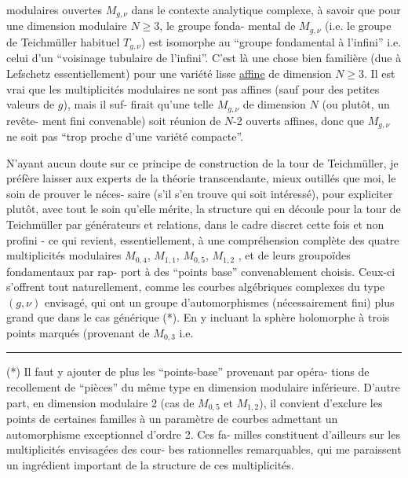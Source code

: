 
modulaires ouvertes $M_{g,\nu}$ dans le contexte analytique complexe,
à savoir que pour une dimension modulaire $N \geq 3$, le groupe fonda-%
mental de $M_{g,\nu}$ (i.e. le groupe de Teichmüller habituel $T_{g,\nu}$)
est isomorphe au ``groupe fondamental à l'infini'' i.e. celui d'un
``voisinage tubulaire de l'infini''. C'est là une chose bien familière
(due à Lefschetz essentiellement) pour une variété lisse \uline{affine} de
dimension $N \geq 3$. Il est vrai que les multiplicités modulaires ne
sont pas affines (sauf pour des petites valeurs de $g$), mais il suf-%
firait qu'une telle $M_{g,\nu}$ de dimension $N$ (ou plutôt, un revête-%
\margin{\unsure{$\frown$}}ment fini convenable) soit réunion de $N$-2 ouverts affines, donc
que $M_{g,\nu}$ ne soit pas ``trop proche d'une variété compacte''.

N'ayant aucun doute sur ce principe de construction de la
tour de Teichmüller, je préfère laisser aux experts de la théorie
transcendante, mieux outillés que moi, le soin de prouver le néces-%
saire (s'il s'en trouve qui soit intéressé), pour expliciter plutôt,
avec tout le soin qu'elle mérite, la structure qui en découle pour
la tour de Teichmüller par générateurs et relations, dans le cadre
discret cette fois et non profini - ce qui revient, essentiellement,
à une compréhension complète des quatre multiplicités modulaires
$M_{0,4}$, $M_{1,1}$, $M_{0,5}$, $M_{1,2}$ , et de leurs groupoïdes fondamentaux par rap-%
port à des ``points base'' convenablement choisis. Ceux-ci s'offrent
tout naturellement, comme les courbes algébriques complexes du type
$(g,\nu)$ envisagé, qui ont un groupe d'automorphismes (nécessairement
fini) plus grand que dans le cas générique (*). En y incluant la
sphère holomorphe à trois points marqués (provenant de $M_{0,3}$ i.e.

\rule{4cm}{0.4pt}

(*) Il faut y ajouter de plus les ``points-base'' provenant par opéra-%
tions de recollement de ``pièces'' du même type en dimension modulaire
inférieure. D'autre part, en dimension modulaire 2 (cas de $M_{0,5}$ et $M_{1,2}$),
il convient d'exclure les points de certaines familles à un paramètre
de courbes admettant un automorphisme exceptionnel d'ordre 2. Ces fa-%
milles constituent d'ailleurs sur les multiplicités envisagées des cour-%
bes rationnelles remarquables, qui me paraissent un ingrédient important
de la structure de ces multiplicités.

